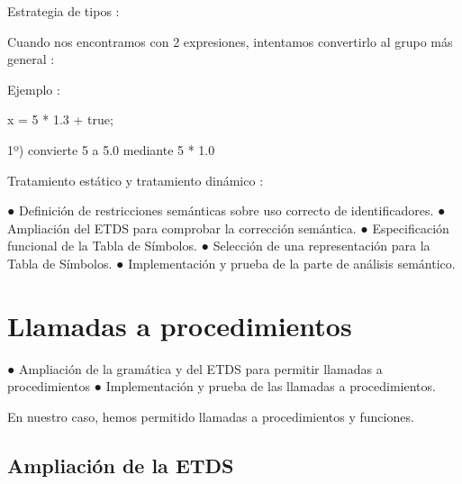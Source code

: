 	
	Estrategia de tipos :

Cuando nos encontramos con 2 expresiones, intentamos convertirlo al grupo más general :

Ejemplo : 

x = 5 * 1.3 + true;

1º)  convierte 5 a 5.0 mediante 5 * 1.0




Tratamiento estático y tratamiento dinámico :

● Definición de restricciones semánticas sobre uso correcto de identificadores.
● Ampliación del ETDS para comprobar la corrección semántica.
● Especificación funcional de la Tabla de Símbolos.
● Selección de una representación para la Tabla de Símbolos.
● Implementación y prueba de la parte de análisis semántico.

\section{Llamadas a procedimientos}

● Ampliación de la gramática y del ETDS para permitir llamadas a procedimientos 
● Implementación y prueba de las llamadas a procedimientos.

En nuestro caso, hemos permitido llamadas a procedimientos y funciones.

\subsection{Ampliación de la ETDS}

